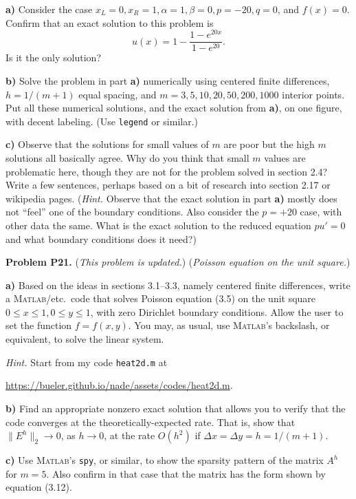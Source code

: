 \documentclass[12pt]{amsart}
\newcommand{\Matlab}{\textsc{Matlab}\xspace}
\newcommand{\prob}[1]{\bigskip\noindent\textbf{#1}\quad }
\newcommand{\epart}[1]{\medskip\noindent\textbf{#1)}\quad }
\begin{document}
\epart{a}  Consider the case $x_L=0,x_R=1,\alpha=1,\beta=0,p=-20,q=0$, and $f(x)=0$.  Confirm that an exact solution to this problem is
    $$u(x) = 1 - \frac{1 - e^{20x}}{1-e^{20}}.$$
Is it the only solution?

\epart{b}  Solve the problem in part \textbf{a)} numerically using centered finite differences, $h=1/(m+1)$ equal spacing, and $m=3,5,10,20,50,200,1000$ interior points.  Put all these numerical solutions, and the exact solution from \textbf{a)}, on one figure, with decent labeling.  (Use \texttt{legend} or similar.)

\epart{c}  Observe that the solutions for small values of $m$ are poor but the high $m$ solutions all basically agree.  Why do you think that small $m$ values are problematic here, though they are not for the problem solved in section 2.4?   Write a few sentences, perhaps based on a bit of research into section 2.17 or wikipedia pages. (\emph{Hint.}  Observe that the exact solution in part \textbf{a)} mostly does not ``feel'' one of the boundary conditions.  Also consider the $p=+20$ case, with other data the same.  What is the exact solution to the reduced equation $pu'=0$ and what boundary conditions does it need?)


\prob{Problem P21.}  (\emph{This problem is updated.})  \quad (\emph{Poisson equation on the unit square.})

\epart{a}  Based on the ideas in sections 3.1--3.3, namely centered finite differences, write a \Matlab/etc.~code that solves Poisson equation (3.5) on the unit square $0\le x \le 1, 0 \le y \le 1$, with zero Dirichlet boundary conditions.  Allow the user to set the function $f=f(x,y)$.  You may, as usual, use \Matlab's backslash, or equivalent, to solve the linear system.

\medskip
\noindent \emph{Hint.}  Start from my code \texttt{heat2d.m} at

\url{https://bueler.github.io/nade/assets/codes/heat2d.m}.

\epart{b}  Find an appropriate nonzero exact solution that allows you to verify that the code converges at the theoretically-expected rate.  That is, show that $\|E^h\|_2 \to 0$, as $h\to 0$, at the rate $O(h^2)$ if $\Delta x = \Delta y = h = 1 / (m+1)$.

\epart{c}  Use \Matlab's \texttt{spy}, or similar, to show the sparsity pattern of the matrix $A^h$ for $m=5$.  Also confirm in that case that the matrix has the form shown by equation (3.12).
\end{document}
